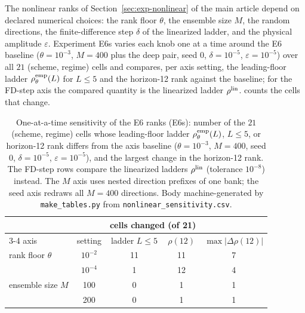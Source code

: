 \documentclass[11pt,a4paper]{article}
\begin{document}
The nonlinear ranks of Section~\ref{sec:exp-nonlinear} of the main article depend on declared numerical choices: the rank floor $\theta$, the ensemble size $M$, the random directions, the finite-difference step $\delta$ of the linearized ladder, and the physical amplitude $\varepsilon$.
Experiment E6s varies each knob one at a time around the E6 baseline ($\theta=10^{-3}$, $M=400$ plus the deep pair, seed $0$, $\delta=10^{-5}$, $\varepsilon=10^{-5}$) over all $21$ (scheme, regime) cells and compares, per axis setting, the leading-floor ladder $\rho^{\rm emp}_\theta(L)$ for $L\le5$ and the horizon-12 rank against the baseline; for the FD-step axis the compared quantity is the linearized ladder $\rho^{\rm lin}$.
 counts the cells that change.

\begin{table}[htbp]
\centering
\caption{One-at-a-time sensitivity of the E6 ranks (E6s): number of the $21$ (scheme, regime) cells whose leading-floor ladder $\rho^{\rm emp}_\theta(L)$, $L\le5$, or horizon-12 rank differs from the axis baseline ($\theta=10^{-3}$, $M=400$, seed $0$, $\delta=10^{-5}$, $\varepsilon=10^{-5}$), and the largest change in the horizon-12 rank.
The FD-step rows compare the linearized ladders $\rho^{\rm lin}$ (tolerance $10^{-8}$) instead.
The $M$ axis uses nested direction prefixes of one bank; the seed axis redraws all $M=400$ directions.
Body machine-generated by \texttt{make\_tables.py} from \texttt{nonlinear\_sensitivity.csv}.}
\label{tab:sensitivity}
\begin{tabular}{@{}lcccc@{}}
\toprule
                              &           & \multicolumn{2}{c}{cells changed (of 21)} &                                     \\
\cmidrule(lr){3-4}
axis                          & setting   & ladder $L\le5$                            & $\rho(12)$ & $\max|\Delta\rho(12)|$ \\
\midrule
rank floor $\theta$           & $10^{-2}$ & 11                                        & 11         & 7                      \\
                              & $10^{-4}$ & 1                                         & 12         & 4                      \\
\addlinespace
ensemble size $M$             & 100       & 0                                         & 1          & 1                      \\
                              & 200       & 0                                         & 1          & 1                      \\

\end{tabular}
\end{table}
\end{document}
